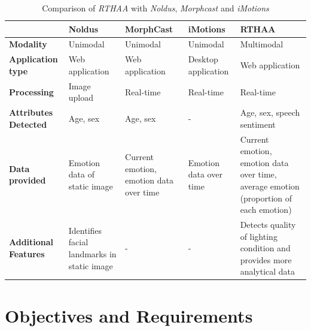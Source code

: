 \documentclass[12pt, a4paper]{article}
\begin{document}
\begin{table}[H]
    \centering
    \begin{tabular}{|L{2.5cm}|L{2.5cm}|L{2.5cm}|L{2.5cm}|L{2.5cm}|}
        \hline
         & \normalsize{\textbf{Noldus}} & \normalsize{\textbf{MorphCast}} & \normalsize{\textbf{iMotions}} & \normalsize{\textbf{RTHAA}}
        \\ \hline

        \textbf{Modality} & Unimodal & Unimodal & Unimodal & Multimodal  \\ \hline
        \textbf{Application type} & Web application & Web application &  Desktop application & Web application  \\ \hline
        \textbf{Processing} & Image upload & Real-time & Real-time & Real-time  \\ \hline
        \textbf{Attributes Detected} & Age, sex & Age, sex & - & Age, sex, speech sentiment  \\ \hline
        \textbf{Data provided} & Emotion data of static image & Current emotion, emotion data over time & Emotion data over time & Current emotion, emotion data over time, average emotion (proportion of each emotion)\\ \hline
        \textbf{Additional Features} & Identifies facial landmarks in static image & - & - & Detects quality of lighting condition and provides more analytical data  \\ \hline

    \end{tabular}
    \caption{Comparison of \textit{RTHAA} with \textit{Noldus}, \textit{Morphcast} and \textit{iMotions}}
    \label{tab:existingsolutions}
\end{table}





\clearpage
\section{Objectives and Requirements}


\end{document}

